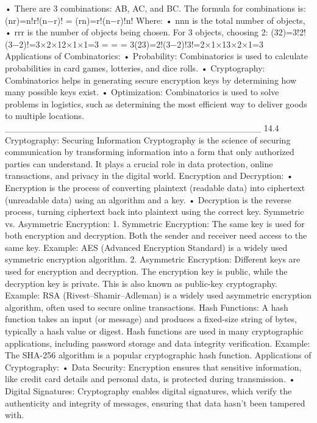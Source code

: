 •	There are 3 combinations: AB, AC, and BC.
The formula for combinations is:
(nr)=n!r!(n−r)! = (rn)=r!(n−r)!n!
Where:
•	nnn is the total number of objects,
•	rrr is the number of objects being chosen.
For 3 objects, choosing 2:
(32)=3!2!(3−2)!=3×2×12×1×1=3 =  =  = 3(23)=2!(3−2)!3!=2×1×13×2×1=3
Applications of Combinatorics:
•	Probability: Combinatorics is used to calculate probabilities in card games, lotteries, and dice rolls.
•	Cryptography: Combinatorics helps in generating secure encryption keys by determining how many possible keys exist.
•	Optimization: Combinatorics is used to solve problems in logistics, such as determining the most efficient way to deliver goods to multiple locations.
________________________________________
14.4 Cryptography: Securing Information
Cryptography is the science of securing communication by transforming information into a form that only authorized parties can understand. It plays a crucial role in data protection, online transactions, and privacy in the digital world.
Encryption and Decryption:
•	Encryption is the process of converting plaintext (readable data) into ciphertext (unreadable data) using an algorithm and a key.
•	Decryption is the reverse process, turning ciphertext back into plaintext using the correct key.
Symmetric vs. Asymmetric Encryption:
1.	Symmetric Encryption: The same key is used for both encryption and decryption. Both the sender and receiver need access to the same key.
Example: AES (Advanced Encryption Standard) is a widely used symmetric encryption algorithm.
2.	Asymmetric Encryption: Different keys are used for encryption and decryption. The encryption key is public, while the decryption key is private. This is also known as public-key cryptography.
Example: RSA (Rivest–Shamir–Adleman) is a widely used asymmetric encryption algorithm, often used to secure online transactions.
Hash Functions:
A hash function takes an input (or message) and produces a fixed-size string of bytes, typically a hash value or digest. Hash functions are used in many cryptographic applications, including password storage and data integrity verification.
Example: The SHA-256 algorithm is a popular cryptographic hash function.
Applications of Cryptography:
•	Data Security: Encryption ensures that sensitive information, like credit card details and personal data, is protected during transmission.
•	Digital Signatures: Cryptography enables digital signatures, which verify the authenticity and integrity of messages, ensuring that data hasn’t been tampered with.
